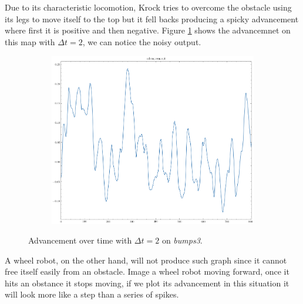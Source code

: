 \documentclass[../document.tex]{subfiles}
\begin{document}
Due to its characteristic locomotion, Krock tries to overcome the obstacle using its legs to move itself to the top but it fell backs producing a spicky advancement where first it is positive and then negative. Figure \ref{fig : krock-bumps-advs} shows the advancemnet on this map with $\Delta t = 2$, we can notice the noisy output.

\begin{figure}[htbp]
    \centering
    \begin{subfigure}[b]{0.45\textwidth}
        \includegraphics[width=\linewidth]{../img/3/find_tr/100-bumps3}
    \end{subfigure}

\caption{Advancement over time with  $\Delta t = 2$ on \emph{bumps3}.}
\label{fig : krock-bumps-advs}
\end{figure}
A wheel robot, on the other hand, will not produce such graph since it cannot free itself easily from an obstacle. Image a wheel robot moving forward, once it hits an obstance it stops moving, if we plot its advancement in this situation it will look more like a step than a series of spikes.
\end{document}
